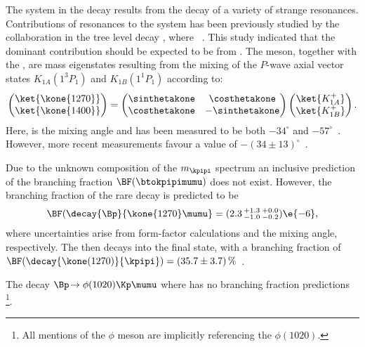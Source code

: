The \kpipi system in the decay \btokpipimumu results from the decay of a variety of strange
resonances.
Contributions of resonances to the \kpipi system has been previously studied by the \belle
collaboration in the tree level decay \btojpsikpipi, where \jpsitomumu~\cite{Guler:2010if}.
This study indicated that the dominant contribution should be expected
to be from .
The  meson, together with the , are mass eigenstates resulting from the
mixing of the $P$-wave axial vector states $K_{1A}(1^3P_1)$ and $K_{1B}(1^1P_1)$ according to:
\begin{equation}
  \begin{pmatrix}
    \ket{\kone{1270}} \\
    \ket{\kone{1400}}
  \end{pmatrix}
  =
  \begin{pmatrix}
    \sinthetakone & \costhetakone \\
    \costhetakone & -\sinthetakone
  \end{pmatrix}
  \begin{pmatrix}
    \ket{K_{1A}^+} \\
    \ket{K_{1B}^+}
  \end{pmatrix}.
  \label{eq:k1mixing}
\end{equation}
Here, \thetakone is the mixing angle and has been measured to be both $-34^\circ$ and
$-57^\circ$~\cite{PhysRevD.47.1252,Tayduganov:2011ui,Hatanaka:2008xj,Cheng:2011pb,Divotgey:2013jba,Cheng:2013cwa}.
However, more recent measurements favour a value of
$-(34\pm13)^\circ$~\cite{Hatanaka:2008xj,Cheng:2011pb,Divotgey:2013jba,Cheng:2013cwa}.

Due to the unknown composition of the $m_\kpipi$ spectrum an inclusive prediction of the branching
fraction $\BF(\btokpipimumu)$ does not exist.
However, the branching fraction of the rare decay  is predicted to
be~\cite{Hatanaka:2008gu}
\begin{equation}
  \BF(\decay{\Bp}{\kone{1270}\mumu} = (2.3\,^{+1.3}_{-1.0}\,^{+0.0}_{-0.2})\e{-6},
\end{equation}
where uncertainties arise from form-factor calculations and the mixing angle, respectively.
The  then decays into the \kpipi final state, with a branching fraction of
$\BF(\decay{\kone(1270)}{\kpipi})=(35.7\pm3.7)\,\%$~\cite{PDG2012}.

The decay $\Bp\!\to\phi(1020)\Kp\mumu$ where \decay{\phi}{\kk} has no branching fraction
predictions
\footnote{All mentions of the $\phi$ meson are implicitly
  referencing the $\phi(1020)$.
}.




